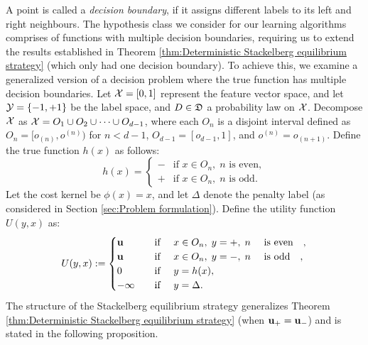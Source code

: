 A point is called a \textit{decision boundary}, if it assigns different labels to its left and right neighbours. 
The hypothesis class we consider for our learning algorithms comprises of functions with multiple decision boundaries, requiring us to extend the results established in Theorem \ref{thm:Deterministic Stackelberg equilibrium strategy} (which only had one decision boundary). To achieve this, we examine a generalized version of a decision problem where the true function has multiple decision boundaries. Let $\mathcal{X} = [0,1]$ represent the feature vector space, and let $\mathcal{Y} = \{-1, +1\}$ be the label space, and $D \in \mathfrak{D}$ a probability law on $\mathcal{X}$. Decompose $\mathcal{X}$ as $\mathcal{X} = O_1 \cup O_2 \cup \cdots \cup O_{d-1}$, where each $O_n$ is a disjoint interval defined as $O_n = [o_{(n)}, o^{(n)})$ for $n < d-1$, $O_{d-1} = [o_{d-1}, 1]$, and $o^{(n)} = o_{(n+1)}$. Define the true function $h(x)$ as follows:
\begin{equation}\label{eqn:multiple boundary true function}
    h(x) = \begin{cases}
        \minus & \text{if } x \in O_n, \; n \text{ is even}, \\
        \plus & \text{if } x \in O_n, \; n \text{ is odd}.
    \end{cases}
\end{equation}
Let the cost kernel be $\phi(x) = x$, and let $\Delta$ denote the penalty label (as considered in Section \ref{sec:Problem formulation}). Define the utility function $U(y,x)$ as:
\begin{equation}\label{eqn:Utility2}
    U(y,x) := \begin{cases}
        \uu & \text{if } x \in O_n, \; y = \plus, \; n \text{ is even}, \\
        \uu & \text{if } x \in O_n, \; y = \minus, \; n \text{ is odd}, \\
        0 & \text{if } y = h(x), \\
        -\infty & \text{if } y = \Delta.
    \end{cases}
\end{equation}
The structure of the Stackelberg equilibrium strategy generalizes Theorem \ref{thm:Deterministic Stackelberg equilibrium strategy} (when $\mathbf{u_+} = \mathbf{u_-}$) and is stated in the following proposition.

